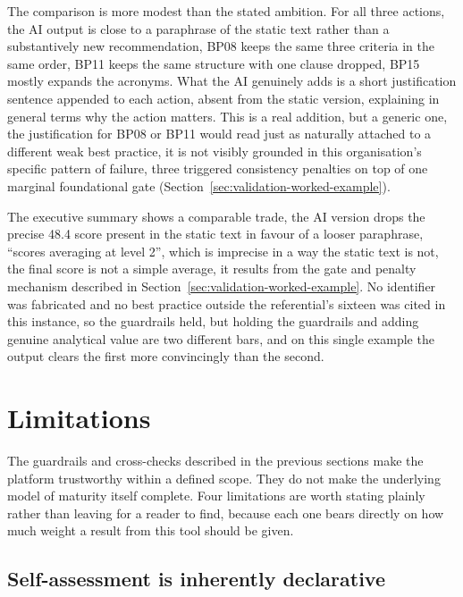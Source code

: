 The comparison is more modest than the stated ambition. For all three
actions, the AI output is close to a paraphrase of the static text rather
than a substantively new recommendation, BP08 keeps the same three criteria
in the same order, BP11 keeps the same structure with one clause dropped,
BP15 mostly expands the acronyms. What the AI genuinely adds is a short
justification sentence appended to each action, absent from the static
version, explaining in general terms why the action matters. This is a real
addition, but a generic one, the justification for BP08 or BP11 would read
just as naturally attached to a different weak best practice, it is not
visibly grounded in this organisation's specific pattern of failure, three
triggered consistency penalties on top of one marginal foundational gate
(Section~\ref{sec:validation-worked-example}).

The executive summary shows a comparable trade, the AI version drops the
precise 48.4 score present in the static text in favour of a looser
paraphrase, ``scores averaging at level 2'', which is imprecise in a way the
static text is not, the final score is not a simple average, it results
from the gate and penalty mechanism described in
Section~\ref{sec:validation-worked-example}. No identifier was fabricated
and no best practice outside the referential's sixteen was cited in this
instance, so the guardrails held, but holding the guardrails and adding
genuine analytical value are two different bars, and on this single
example the output clears the first more convincingly than the second.

\section{Limitations}
\label{sec:validation-limitations}

The guardrails and cross-checks described in the previous sections make the
platform trustworthy within a defined scope. They do not make the underlying
model of maturity itself complete. Four limitations are worth stating plainly
rather than leaving for a reader to find, because each one bears directly on
how much weight a result from this tool should be given.

\subsection{Self-assessment is inherently declarative}
\label{sec:validation-declarative-limitation}


